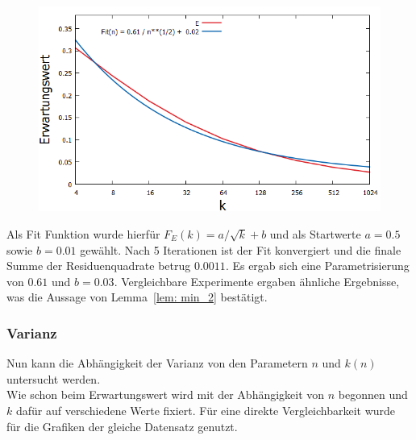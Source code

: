 \begin{figure}[H]
\begin{minipage}[t]{.30\textwidth}
        \includegraphics[width=1.2\textwidth]{pictures/min_filter_fit_E_k}
    \end{minipage}
    \label{fig: min_E_k}
\end{figure}

\noindent
Als Fit Funktion wurde hierfür $F_E(k)= a / \sqrt{k} + b$ und als Startwerte $a=0.5$ sowie $b=0.01$ gewählt. Nach 5 Iterationen ist der Fit konvergiert und die finale Summe der Residuenquadrate betrug $0.0011$. Es ergab sich eine Parametrisierung von $0.61$ und $b=0.03$. Vergleichbare Experimente ergaben ähnliche Ergebnisse, was die Aussage von Lemma~\ref{lem: min_2} bestätigt.\\[.1cm]
\subsubsection*{Varianz}
Nun kann die Abhängigkeit der Varianz von den Parametern $n$ und $k(n)$ untersucht werden.\\[.1cm]
Wie schon beim Erwartungswert wird mit der Abhängigkeit von $n$ begonnen und $k$ dafür auf verschiedene Werte fixiert. Für eine direkte Vergleichbarkeit wurde für die Grafiken der gleiche Datensatz genutzt.

